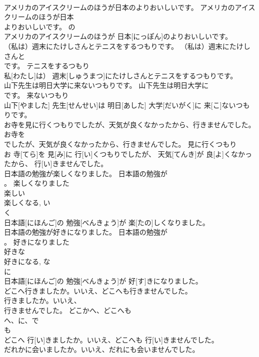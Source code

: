 \documentclass[8pt]{extreport}
\begin{document}
\begin{CJK}{UTF8}{min}
\\	アメリカのアイスクリームのほうが日本のよりおいしいです。	アメリカのアイスクリームのほうが日本
\\	よりおいしいです。	の	
\\	アメリカのアイスクリームのほうが 日本[にっぽん]のよりおいしいです。	
\\	（私は）週末にたけしさんとテニスをするつもりです。	（私は）週末にたけしさんと
\\	です。	テニスをするつもり	
\\	私[わたし]は） 週末[しゅうまつ]にたけしさんとテニスをするつもりです。	
\\	山下先生は明日大学に来ないつもりです。	山下先生は明日大学に
\\	です。	来ないつもり	
\\	山下[やました] 先生[せんせい]は 明日[あした] 大学[だいがく]に 来[こ]ないつもりです。	
\\	お寺を見に行くつもりでしたが、天気が良くなかったから、行きませんでした。	お寺を
\\	でしたが、天気が良くなかったから、行きませんでした。	見に行くつもり	
\\	お 寺[てら]を 見[み]に 行[い]くつもりでしたが、 天気[てんき]が 良[よ]くなかったから、 行[い]きませんでした。	
\\	日本語の勉強が楽しくなりました。	日本語の勉強が
\\	。	楽しくなりました	
\\	楽しい 
\\	楽しくなる, い 
\\	く 
\\	日本語[にほんご]の 勉強[べんきょう]が 楽[たの]しくなりました。	
\\	日本語の勉強が好きになりました。	日本語の勉強が
\\	。	好きになりました	
\\	好きな 
\\	好きになる, な 
\\	に 
\\	日本語[にほんご]の 勉強[べんきょう]が 好[す]きになりました。	
\\	どこへ行きましたか。いいえ、どこへも行きませんでした。	
\\	行きましたか。いいえ、
\\	行きませんでした。	どこかへ、どこへも	
\\	へ、に、で 
\\	も 
\\	どこへ 行[い]きましたか。いいえ、どこへも 行[い]きませんでした。	
\\	だれかに会いましたか。いいえ、だれにも会いませんでした。	

\end{CJK}
\end{document}
